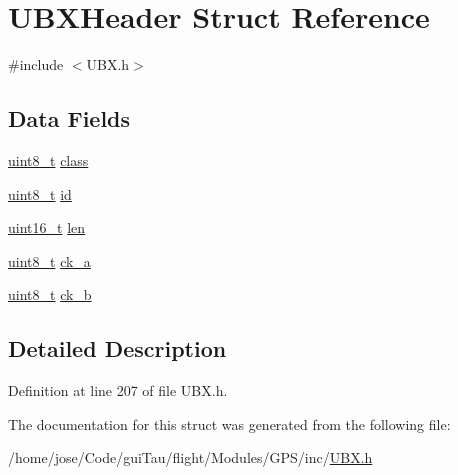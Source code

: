 \hypertarget{struct_u_b_x_header}{\section{U\-B\-X\-Header Struct Reference}
\label{struct_u_b_x_header}
}


{\ttfamily \#include $<$U\-B\-X.\-h$>$}

\subsection*{Data Fields}
\begin{DoxyCompactItemize}
\item 
\hyperlink{stdint_8h_aba7bc1797add20fe3efdf37ced1182c5}{uint8\-\_\-t} \hyperlink{group___g_s_p_module_gab7410b764b3d80030e5a8e5167831303}{class}
\item 
\hyperlink{stdint_8h_aba7bc1797add20fe3efdf37ced1182c5}{uint8\-\_\-t} \hyperlink{group___g_s_p_module_gae65b35dcbe44c08985ab3ba9e1e04793}{id}
\item 
\hyperlink{stdint_8h_a273cf69d639a59973b6019625df33e30}{uint16\-\_\-t} \hyperlink{group___g_s_p_module_gac3357d02e8f968e15c24c81716054a85}{len}
\item 
\hyperlink{stdint_8h_aba7bc1797add20fe3efdf37ced1182c5}{uint8\-\_\-t} \hyperlink{group___g_s_p_module_ga151b080d3305855bcf4fb0c8042d6b7e}{ck\-\_\-a}
\item 
\hyperlink{stdint_8h_aba7bc1797add20fe3efdf37ced1182c5}{uint8\-\_\-t} \hyperlink{group___g_s_p_module_ga5fe662d32012b4caaca9b027df4a3d30}{ck\-\_\-b}
\end{DoxyCompactItemize}


\subsection{Detailed Description}


Definition at line 207 of file U\-B\-X.\-h.



The documentation for this struct was generated from the following file\-:\begin{DoxyCompactItemize}
\item 
/home/jose/\-Code/gui\-Tau/flight/\-Modules/\-G\-P\-S/inc/\hyperlink{_u_b_x_8h}{U\-B\-X.\-h}\end{DoxyCompactItemize}
